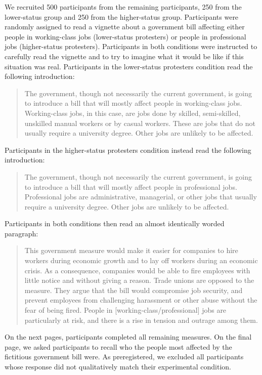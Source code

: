 \documentclass[12pt, letterpaper]{article}
\begin{document}
We recruited 500 participants from the remaining participants, 250 from
the lower-status group and 250 from the higher-status group.
Participants were randomly assigned to read a vignette about a
government bill affecting either people in working-class jobs
(lower-status protesters) or people in professional jobs (higher-status
protesters). Participants in both conditions were instructed to
carefully read the vignette and to try to imagine what it would be like
if this situation was real. Participants in the lower-status protesters
condition read the following introduction:

\begin{quote}
The government, though not necessarily the current government, is going
to introduce a bill that will mostly affect people in working-class
jobs. Working-class jobs, in this case, are jobs done by skilled,
semi-skilled, unskilled manual workers or by casual workers. These are
jobs that do not usually require a university degree. Other jobs are
unlikely to be affected.
\end{quote}

\noindent Participants in the higher-status protesters condition instead
read the following introduction:

\begin{quote}
The government, though not necessarily the current government, is going
to introduce a bill that will mostly affect people in professional jobs.
Professional jobs are administrative, managerial, or other jobs that
usually require a university degree. Other jobs are unlikely to be
affected.
\end{quote}

\noindent Participants in both conditions then read an almost
identically worded paragraph:

\begin{quote}
This government measure would make it easier for companies to hire
workers during economic growth and to lay off workers during an economic
crisis. As a consequence, companies would be able to fire employees with
little notice and without giving a reason. Trade unions are opposed to
the measure. They argue that the bill would compromise job security, and
prevent employees from challenging harassment or other abuse without the
fear of being fired. People in {[}working-class/professional{]} jobs are
particularly at risk, and there is a rise in tension and outrage among
them.
\end{quote}

On the next pages, participants completed all remaining measures. On the
final page, we asked participants to recall who the people most affected
by the fictitious government bill were. As preregistered, we excluded
all participants whose response did not qualitatively match their
experimental condition.
\end{document}
